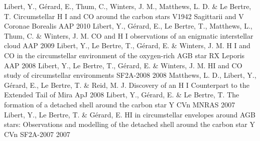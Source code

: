\begin{cventries}
  \cventry 
    {Libert, Y., Gérard, E., Thum, C., Winters, J. M., Matthews, L. D. \& Le Bertre, T.}
    {Circumstellar H I and CO around the carbon stars V1942 Sagittarii and V Coronae Borealis}
    {AAP} 
    {2010} 
    {}
  \cventry 
    {Libert, Y., Gérard, E., Le Bertre, T., Matthews, L., Thum, C. \& Winters, J. M.}
    {CO and H I observations of an enigmatic interstellar cloud}
    {AAP}  
    {2009} 
    {}
  \cventry 
    {Libert, Y., Le Bertre, T., Gérard, E. \& Winters, J. M.}
    {H I and CO in the circumstellar environment of the oxygen-rich AGB star RX Leporis}
    {AAP}
    {2008} 
    {}
  \cventry 
    {Libert, Y., Le Bertre, T., Gérard, E. \& Winters, J. M.}
    {HI and CO study of circumstellar environments}
    {SF2A-2008}  
    {2008} 
    {}
  \cventry
    {Matthews, L. D., Libert, Y., Gérard, E., Le Bertre, T. \& Reid, M. J.}
    {Discovery of an H I Counterpart to the Extended Tail of Mira}
    {ApJ}  
    {2008}
    {}
  \cventry 
    {Libert, Y., Gérard, E. \& Le Bertre, T.}
    {The formation of a detached shell around the carbon star Y CVn}
    {MNRAS}  
    {2007} 
    {}
  \cventry 
    {Libert, Y., Le Bertre, T. \& Gérard, E.}
    {HI in circumstellar envelopes around AGB stars: Observations and modelling of the detached shell around the carbon star Y CVn}
    {SF2A-2007}  
    {2007} 
    {}

\end{cventries}



